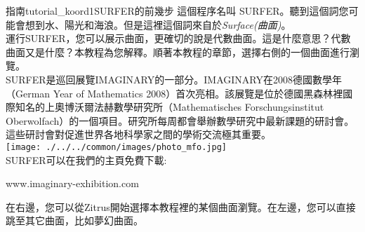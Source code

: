 \begin{surferIntroPage}{指南}{tutorial_koord1}{SURFER的前幾步}
這個程序名叫 SURFER。聽到這個詞您可能會想到水、陽光和海浪。但是這裡這個詞來自於\textit{Surface(曲面)}。
\\

運行SURFER，您可以展示曲面，更確切的說是代數曲面。這是什麼意思？代數曲面又是什麼？本教程為您解釋。順著本教程的章節，選擇右側的一個曲面進行瀏覽。\\
SURFER是巡回展覽IMAGINARY的一部分。IMAGINARY在2008德國數學年（German Year of Mathematics 2008）首次亮相。該展覽是位於德國黑森林裡國際知名的上奧博沃爾法赫數學研究所（Mathematisches Forschungsinstitut Oberwolfach）的一個項目。研究所每周都會舉辦數學研究中最新課題的研討會。這些研討會對促進世界各地科學家之間的學術交流極其重要。\\
\vspace{0.2cm} \hspace{3.5cm}\texttt{[image: ./../../common/images/photo\_mfo.jpg]}\\
SURFER可以在我們的主頁免費下載: \\
\begin{centering}
www.imaginary-exhibition.com\\
\end{centering}
 \vspace{0.2cm}
在右邊，您可以從Zitrus開始選擇本教程裡的某個曲面瀏覽。在左邊，您可以直接跳至其它曲面，比如夢幻曲面。
\end{surferIntroPage}
